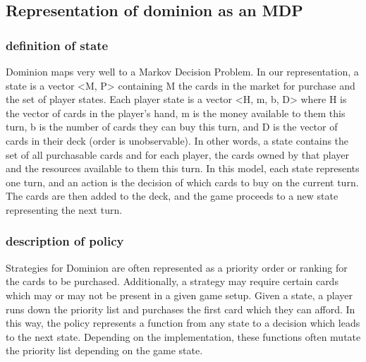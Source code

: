 \documentclass{article}
\begin{document}
\subsection{Representation of dominion as an MDP}
\subsubsection{definition of state}
Dominion maps very well to a Markov Decision Problem. In our representation, a state is a vector <M, P> containing M the cards in the market for purchase and the set of  player states. Each player state is a vector <H, m, b, D> where H is the vector of cards in the player’s hand, m is the money available to them this turn, b is the number of cards they can buy this turn, and D is the vector of cards in their deck (order is unobservable). In other words, a state contains the set of all purchasable cards and for each player, the cards owned by that player and the resources available to them this turn. In this model, each state represents one turn, and an action is the decision of which cards to buy on the current turn. The cards are then added to the deck, and the game proceeds to a new state representing the next turn.
\subsubsection{description of policy}
  Strategies for Dominion are often represented as a priority order or ranking for the cards to be purchased. Additionally, a strategy may require certain cards which may or may not be present in a given game setup. Given a state, a player runs down the priority list and purchases the first card which they can afford. In this way, the policy represents a function from any state to a decision which leads to the next state. Depending on the implementation, these functions often mutate the priority list depending on the game state.
\end{document}
